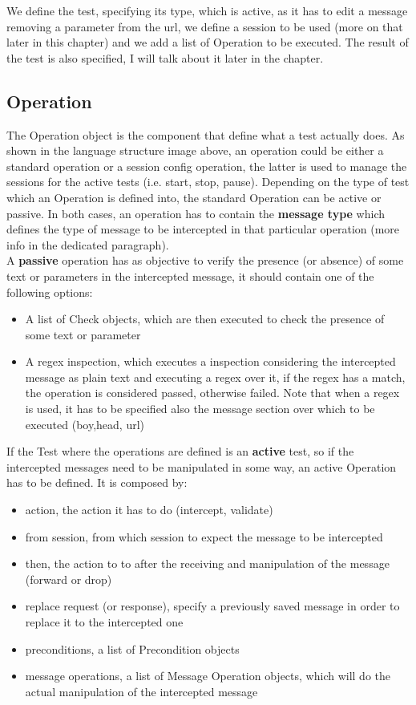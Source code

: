 We define the test, specifying its type, which is active, as it has to edit a message removing a parameter from the url, we define a session to be used (more on that later in this chapter) and we add a list of Operation to be executed. The result of the test is also specified, I will talk about it later in the chapter.

\subsection{Operation}
The Operation object is the component that define what a test actually does. As shown in the language structure image above, an operation could be either a standard operation or a session config operation, the latter is used to manage the sessions for the active tests (i.e. start, stop, pause). Depending on the type of test which an Operation is defined into, the standard Operation can be active or passive.
In both cases, an operation has to contain the \textbf{message type} which defines the type of message to be intercepted in that particular operation (more info in the dedicated paragraph).
\\A \textbf{passive} operation has as objective to verify the presence (or absence) of some text or parameters in the intercepted message, it should contain one of the following options:
\begin{itemize}
    \item A list of Check objects, which are then executed to check the presence of some text or parameter
    \item A regex inspection, which executes a inspection considering the intercepted message as plain text and executing a regex over it, if the regex has a match, the operation is considered passed, otherwise failed. Note that when a regex is used, it has to be specified also the message section over which to be executed (boy,head, url)
\end{itemize}

If the Test where the operations are defined is an \textbf{active} test, so if the intercepted messages need to be manipulated in some way, an active Operation has to be defined. It is composed by:
\begin{itemize}
    \item action, the action it has to do (intercept, validate)
    \item from session, from which session to expect the message to be intercepted
    \item then, the action to to after the receiving and manipulation of the message (forward or drop)
    \item replace request (or response), specify a previously saved message in order to replace it to the intercepted one
    \item preconditions, a list of Precondition objects
    \item message operations, a list of Message Operation objects, which will do the actual manipulation of the intercepted message
\end{itemize}

